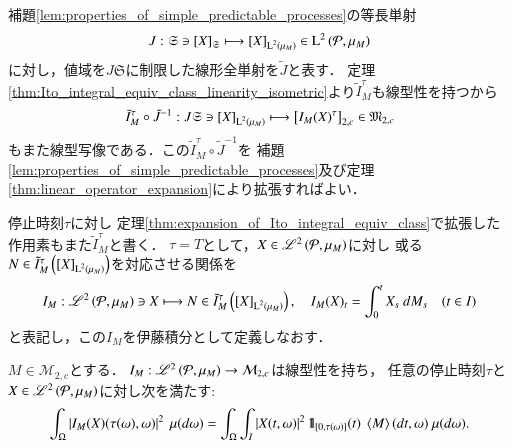 	\begin{prf}
		補題\ref{lem:properties_of_simple_predictable_processes}の等長単射
		\begin{align}
			J:\mathfrak{S} \ni \left[X\right]_{\mathfrak{S}} \longmapsto \left[X\right]_{\operatorname{L}^{2} \left(\mu_M\right)} \in \operatorname{L}^{2} \left(\mathcal{P},\mu_M\right)
		\end{align}
		に対し，値域を$J\mathfrak{S}$に制限した線形全単射を$\tilde{J}$と表す．
		定理\ref{thm:Ito_integral_equiv_class_linearity_isometric}より$\tilde{I}^\tau_M$も線型性を持つから
		\begin{align}
			\tilde{I}^\tau_M \circ \tilde{J}^{-1}: J \mathfrak{S} \ni \left[X\right]_{\operatorname{L}^{2} \left(\mu_M\right)} \longmapsto \left[I_M(X)^\tau\right]_{2,c} \in \mathfrak{M}_{2,c}
		\end{align}
		もまた線型写像である．この$\tilde{I}^\tau_M \circ \tilde{J}^{-1}$を
		補題\ref{lem:properties_of_simple_predictable_processes}及び定理\ref{thm:linear_operator_expansion}により拡張すればよい．
		\QED
	\end{prf}
	
	\begin{screen}
		\begin{dfn}[伊藤積分の拡張]
			停止時刻$\tau$に対し
			定理\ref{thm:expansion_of_Ito_integral_equiv_class}で拡張した作用素もまた$\tilde{I}^\tau_M$と書く．
			$\tau = T$として，$X \in \mathscr{L}^{2} \left(\mathcal{P},\mu_M\right)$に対し
			或る$N \in \tilde{I}^\tau_M\left( \left[X\right]_{\operatorname{L}^{2} \left(\mu_M\right)} \right)$を対応させる関係を
			\begin{align}
				I_M: \mathscr{L}^{2} \left(\mathcal{P},\mu_M\right) \ni X \longmapsto N \in \tilde{I}^\tau_M\left( \left[X\right]_{\operatorname{L}^{2} \left(\mu_M\right)} \right), \quad
				I_M(X)_t = \int_0^t X_s\ d M_s \quad (t \in I)
			\end{align}
			と表記し，この$I_M$を伊藤積分として定義しなおす．
			\label{dfn:expansion_of_Ito_integral}
		\end{dfn}
	\end{screen}
	
	\begin{screen}
		\begin{lem}[拡張された伊藤積分の線型等長性]
			$M \in \mathcal{M}_{2,c}$とする．
			$I_M:\mathscr{L}^{2} \left(\mathcal{P},\mu_M\right) \rightarrow \mathcal{M}_{2,c}$は線型性を持ち，
			任意の停止時刻$\tau$と$X \in \mathscr{L}^{2} \left(\mathcal{P},\mu_M\right)$に対し次を満たす:
			\begin{align}
				\int_\Omega \left| I_M(X)(\tau(\omega),\omega) \right|^2\ \mu(d\omega)
				= \int_\Omega \int_I \left| X(t,\omega) \right|^2 \defunc_{[0,\tau(\omega)]}(t)\ \inprod<M>(dt,\omega)\ \mu(d\omega).
			\end{align}
			\label{thm:stopped_Ito_integral}
		\end{lem}
	\end{screen}
	
